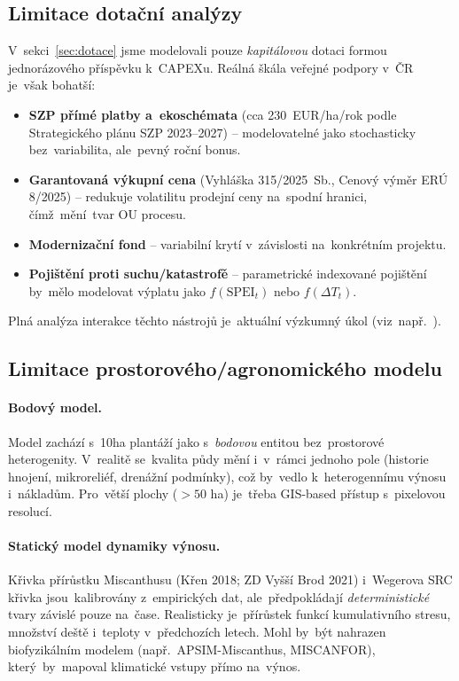 \subsection{Limitace dotační analýzy}
\label{subsec:lim-dotace}

V~sekci~\ref{sec:dotace} jsme modelovali pouze \emph{kapitálovou} dotaci
formou jednorázového příspěvku k~CAPEXu. Reálná škála veřejné podpory
v~ČR je~však bohatší:
\begin{itemize}
\item \textbf{SZP přímé platby a~ekoschémata} (cca 230~EUR/ha/rok
      podle Strategického plánu SZP 2023--2027) -- modelovatelné
      jako stochasticky bez~variabilita, ale~pevný roční bonus.
\item \textbf{Garantovaná výkupní cena} (Vyhláška 315/2025~Sb.,
      Cenový výměr ERÚ 8/2025) -- redukuje volatilitu prodejní ceny
      na~spodní hranici, čímž~mění~tvar OU procesu.
\item \textbf{Modernizační fond} -- variabilní krytí v~závislosti
      na~konkrétním projektu.
\item \textbf{Pojištění proti suchu/katastrofě} -- parametrické
      indexované pojištění by~mělo modelovat výplatu jako
      $f(\mathrm{SPEI}_t)$ nebo $f(\Delta T_t)$.
\end{itemize}
Plná analýza interakce těchto nástrojů je~aktuální výzkumný úkol
(viz~např.~\citet{knapek_2024}).

\subsection{Limitace prostorového/agronomického modelu}
\label{subsec:lim-prostor}

\paragraph{Bodový model.}
Model zachází s~10ha plantáží jako s~\emph{bodovou} entitou bez~prostorové
heterogenity. V~realitě se~kvalita půdy mění i~v~rámci jednoho pole
(historie hnojení, mikroreliéf, drenážní podmínky), což by~vedlo
k~heterogennímu výnosu i~nákladům. Pro~větší plochy ($> 50$ ha)
je~třeba GIS-based přístup s~pixelovou resolucí.

\paragraph{Statický model dynamiky výnosu.}
Křivka přírůstku Miscanthusu (Křen 2018; ZD Vyšší Brod 2021)
i~Wegerova SRC křivka jsou~kalibrovány z~empirických dat, ale~předpokládají
\emph{deterministické} tvary závislé pouze na~čase. Realisticky
je~přírůstek funkcí kumulativního stresu, množství deště i~teploty
v~předchozích letech. Mohl by~být nahrazen biofyzikálním modelem
(např.~APSIM-Miscanthus, MISCANFOR), který~by~mapoval klimatické
vstupy přímo na~výnos.


